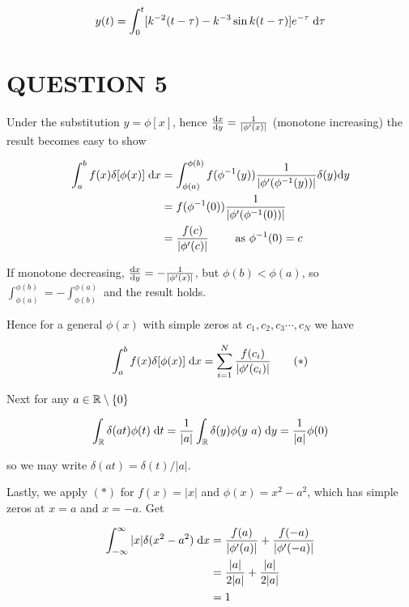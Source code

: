 \documentclass[a4paper]{article}
\begin{document}
\begin{align*}
y(t) & = \int_{0}^{t} [k^{-2} (t - \tau) - k^{-3} \sin k(t-\tau) ]e^{-\tau} \; \mathrm{d} \tau    \\
\end{align*}




\section{QUESTION 5}

Under the substitution $ y = \phi[x] $, hence $ \frac{\mathrm{d} x}{\mathrm{d} y} =  \frac{1}{| \phi'(x) |} $ (monotone increasing) the result becomes easy to show

\begin{align*}
\int_{a}^{b} f(x) \delta[\phi(x)]  \; \mathrm{d} x & = \int_{\phi(a)}^{\phi(b)} f(\phi^{-1}(y)) \frac{1}{| \phi'(\phi^{-1}(y)) |} \delta(y) \mathrm{d} y \\
& = f(\phi^{-1}(0)) \frac{1}{| \phi'(\phi^{-1}(0)) |} \\
& = \frac{f(c)}{| \phi'(c) |} \qquad \text{ as } \phi^{-1}(0) = c
\end{align*}

If monotone decreasing, $ \frac{\mathrm{d} x}{\mathrm{d} y} =  - \frac{1}{| \phi'(x) |} $, but $ \phi(b) < \phi(a) $, so $ \int_{\phi(a)}^{\phi(b)} = - \int_{\phi(b)}^{\phi(a)} $ and the result holds.

Hence for a general $ \phi(x) $ with simple zeros at $ c_{1},c_{2},c_{3}\cdots,c_{N} $ we have

\[ \int_{a}^{b} f(x) \delta[\phi(x)]  \; \mathrm{d} x = \sum_{i=1}^{N}  \frac{f(c_{i})}{| \phi'(c_{i}) |} \qquad (*) \]

Next for any $ a \in \mathbb{R} \setminus \{0 \} $

\[ \int_{\mathbb{R}} \delta(at) \phi(t) \; \mathrm{d} t = \frac{1}{| a |} \int_{\mathbb{R}}  \delta(y) \phi (y \ a) \; \mathrm{d} y = \frac{1}{| a |} \phi(0) \]

so we may write $ \delta(at) = \delta(t) / | a | $.

Lastly, we apply $ (*) $ for $ f(x) = | x | $ and $ \phi(x) = x^{2} - a^{2} $, which has simple zeros at $ x = a $ and $ x = -a $. Get


\begin{align*}
\int_{-\infty}^{\infty} | x | \delta( x^{2} - a^{2} ) \; \mathrm{d} x & = \frac{f(a)}{| \phi'(a) |} + \frac{f(-a)}{| \phi'(-a) |} \\
& = \frac{| a |}{2|  a |} + \frac{| a |}{2| a |} \\
& = 1
\end{align*}
\end{document}
